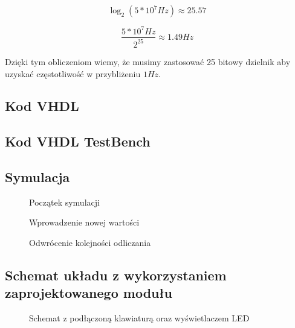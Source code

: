 \documentclass[a4paper,12pt]{extarticle}  %
\begin{document}
$$\log_2(5*10^7Hz)\approx25.57$$

$$\frac{5*10^7Hz}{2^{25}}\approx1.49Hz$$

Dzięki tym obliczeniom wiemy, że musimy zastosować 25 bitowy dzielnik aby uzyskać częstotliwość w przybliżeniu $1Hz$.
\subsection{Kod VHDL}

\subsection{Kod VHDL TestBench}


\subsection{Symulacja}
\begin{figure}[H]
   \centering
   \caption{Początek symulacji}
\end{figure}
\begin{figure}[H]
	\centering
	\caption{Wprowadzenie nowej wartości}
 \end{figure}
 \begin{figure}[H]
	\centering
	\caption{Odwrócenie kolejności odliczania}
 \end{figure}
 \subsection{Schemat układu z wykorzystaniem zaprojektowanego modułu}
 \begin{figure}[H]
	 \centering
	 \caption{Schemat z podłączoną klawiaturą oraz wyświetlaczem LED}
  \end{figure}
\end{document}
